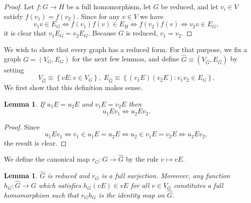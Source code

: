 \documentclass[12pt]{amsart}
\theoremstyle{plain}
\newtheorem{lemma}[theorem]{Lemma}
\numberwithin{equation}{section}
\begin{document}
\begin{proof}
Let $f:G\rightarrow H$ be a full homomorphism, let $G$ be reduced, and let
$v_{i}\in V$ satisfy $f\left(  v_{1}\right)  =f\left(  v_{2}\right)  $. Since
for any $v\in V$ we have
\begin{displaymath}
    v_{1}v\in E_{G}\Longleftrightarrow f\left(  v_{1}\right)  f\left(  v\right)
    \in E_{H}\Longleftrightarrow f\left(  v_{2}\right)  f\left(  v\right)
    \Longleftrightarrow v_{2}v\in E_{G},
\end{displaymath}
it is clear that $v_{1}E_{G}=v_{2}E_{G}$. Because $G$ is reduced,
$v_{1}=v_{2}$.
\end{proof}

We wish to show that every graph has a reduced form. For that purpose, we fix a
graph $G=\left(  V_{G},E_{G}\right)  $ for the next few lemmas, and define
$\widehat{G}\equiv(V_{\widehat{G}},E_{\widehat{G}})$ by setting
\begin{displaymath}
    V_{\widehat{G}}\equiv\left\{  vE:v\in V_{G}\right\}  ,\;E_{\widehat{G}}
    \equiv\left\{  \left(  v_{1}E\right)  \left(  v_{2}E\right)  :v_{1}v_{2}\in
    E_{G}\right\}  .
\end{displaymath}
We first show that this definition makes sense.

\begin{lemma}
If $u_{1}E=u_{2}E$ and $v_{1}E=v_{2}E$ then
\begin{displaymath}
    u_{1}Ev_{1}\Longleftrightarrow u_{2}Ev_{2}.
\end{displaymath}

\end{lemma}

\begin{proof}
Since
\begin{displaymath}
    u_{1}Ev_{1}\Longleftrightarrow v_{1}\in u_{1}E=u_{2}E\Longleftrightarrow
    u_{2}\in v_{1}E=v_{2}E\Longleftrightarrow u_{2}Ev_{2},
\end{displaymath}
the result is clear.
\end{proof}

We define the canonical map $r_{G}:G\rightarrow\widehat{G}$ by the rule
$v\longmapsto vE$.

\begin{lemma}
\label{Lem:Ghat2}$\widehat{G}$ is reduced and $r_{G}$ is a full surjection.
Moreover, any function $h_{G}:\widehat{G}\rightarrow G$ which satisfies
$h_{G}\left( vE\right)  \in vE$ for all $v\in V_{G}$ constitutes a full
homomorphism such that $r_{G}h_{G}$ is the identity map on $\widehat{G}$.
\end{lemma}
\end{document}
